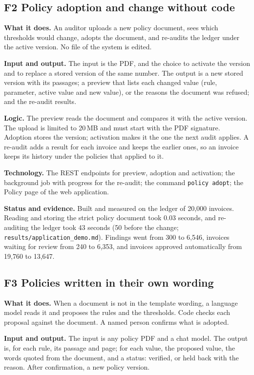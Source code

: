 \documentclass[11pt,a4paper]{article}
\begin{document}
\subsection{F2 Policy adoption and change without code}
\textbf{What it does.} An auditor uploads a new policy document, sees which thresholds would change, adopts the document, and re-audits the ledger under the active version. No file of the system is edited.

\textbf{Input and output.} The input is the PDF, and the choice to activate the version and to replace a stored version of the same number. The output is a new stored version with its passages; a preview that lists each changed value (rule, parameter, active value and new value), or the reasons the document was refused; and the re-audit results.

\textbf{Logic.} The preview reads the document and compares it with the active version. The upload is limited to 20\,MB and must start with the PDF signature. Adoption stores the version; activation makes it the one the next audit applies. A re-audit adds a result for each invoice and keeps the earlier ones, so an invoice keeps its history under the policies that applied to it.

\textbf{Technology.} The REST endpoints for preview, adoption and activation; the background job with progress for the re-audit; the command \texttt{policy adopt}; the Policy page of the web application.

\textbf{Status and evidence.} Built and measured on the ledger of 20,000 invoices. Reading and storing the strict policy document took 0.03 seconds, and re-auditing the ledger took 43 seconds (50 before the change; \texttt{results/application\_demo.md}). Findings went from 300 to 6,546, invoices waiting for review from 240 to 6,353, and invoices approved automatically from 19,760 to 13,647.

\subsection{F3 Policies written in their own wording}
\textbf{What it does.} When a document is not in the template wording, a language model reads it and proposes the rules and the thresholds. Code checks each proposal against the document. A named person confirms what is adopted.

\textbf{Input and output.} The input is any policy PDF and a chat model. The output is, for each rule, its passage and page; for each value, the proposed value, the words quoted from the document, and a status: verified, or held back with the reason. After confirmation, a new policy version.
\end{document}
